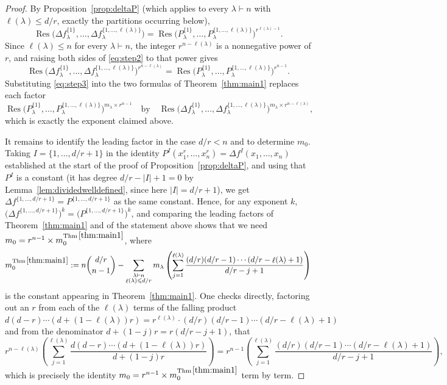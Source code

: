\documentclass[12pt]{amsart}
\theoremstyle{definition}
\newcommand{\Res}{\operatorname{Res}}
\DeclareMathOperator{\len}{\ell}
\begin{document}
\begin{proof}
By Proposition~\ref{prop:deltaP} (which applies to every $\lambda \vdash n$ with $\len(\lambda) \leqslant d/r$, exactly the partitions occurring below),
\begin{equation}
\label{eq:step2}
\Res\Big(\Delta f^{\{1\}}_\lambda,\dots,\Delta f^{\{1,\dots,\len(\lambda)\}}_\lambda\Big) = \Res\Big(P^{\{1\}}_\lambda,\dots,P^{\{1,\dots,\len(\lambda)\}}_\lambda\Big)^{r^{\len(\lambda)-1}}.
\end{equation}
Since $\len(\lambda) \leqslant n$ for every $\lambda \vdash n$, the integer $r^{n-\len(\lambda)}$ is a nonnegative power of $r$, and raising both sides of \eqref{eq:step2} to that power gives
\begin{equation}
\label{eq:step3}
\Res\Big(\Delta f^{\{1\}}_\lambda,\dots,\Delta f^{\{1,\dots,\len(\lambda)\}}_\lambda\Big)^{r^{n-\len(\lambda)}} = \Res\Big(P^{\{1\}}_\lambda,\dots,P^{\{1,\dots,\len(\lambda)\}}_\lambda\Big)^{r^{n-1}}.
\end{equation}
Substituting \eqref{eq:step3} into the two formulas of Theorem~\ref{thm:main1} replaces each factor
\[
\Res\big(P^{\{1\}}_\lambda,\dots,P^{\{1,\dots,\len(\lambda)\}}_\lambda\big)^{m_\lambda \times r^{n-1}} \quad\text{by}\quad \Res\big(\Delta f^{\{1\}}_\lambda,\dots,\Delta f^{\{1,\dots,\len(\lambda)\}}_\lambda\big)^{m_\lambda\times r^{n-\len(\lambda)}},
\]
which is exactly the exponent claimed above.

It remains to identify the leading factor in the case $d/r < n$ and to determine $m_0$. Taking $I = \{1,\dots,d/r+1\}$ in the identity $P^I(x_1^r,\dots,x_n^r) = \Delta f^I(x_1,\dots,x_n)$ established at the start of the proof of Proposition~\ref{prop:deltaP}, and using that $P^I$ is a constant (it has degree $d/r-|I|+1 = 0$ by Lemma~\ref{lem:dividedwelldefined}, since here $|I|=d/r+1$), we get $\Delta f^{\{1,\dots,d/r+1\}} = P^{\{1,\dots,d/r+1\}}$ as the same constant. Hence, for any exponent $k$, $\big(\Delta f^{\{1,\dots,d/r+1\}}\big)^k = \big(P^{\{1,\dots,d/r+1\}}\big)^k$, and comparing the leading factors of Theorem~\ref{thm:main1} and of the statement above shows that we need $m_0 = r^{n-1}\times m_0^{\mathrm{Thm}\,\ref{thm:main1}}$, where
\[
m_0^{\mathrm{Thm}\,\ref{thm:main1}} := n\binom{d/r}{n-1} - \sum_{\substack{\lambda\vdash n\\ \len(\lambda)\leqslant d/r}} m_\lambda\left(\sum_{j=1}^{\len(\lambda)}\frac{(d/r)(d/r-1)\cdots(d/r-\len(\lambda)+1)}{d/r-j+1}\right)
\]
is the constant appearing in Theorem~\ref{thm:main1}. One checks directly, factoring out an $r$ from each of the $\len(\lambda)$ terms of the falling product $d(d-r)\cdots(d+(1-\len(\lambda))r) = r^{\len(\lambda)}\cdot (d/r)(d/r-1)\cdots(d/r-\len(\lambda)+1)$ and from the denominator $d+(1-j)r = r(d/r-j+1)$, that
\[
r^{n-\len(\lambda)}\left(\sum_{j=1}^{\len(\lambda)}\frac{d(d-r)\cdots(d+(1-\len(\lambda))r)}{d+(1-j)r}\right) = r^{n-1}\left(\sum_{j=1}^{\len(\lambda)}\frac{(d/r)(d/r-1)\cdots(d/r-\len(\lambda)+1)}{d/r-j+1}\right),
\]
which is precisely the identity $m_0 = r^{n-1}\times m_0^{\mathrm{Thm}\,\ref{thm:main1}}$ term by term.


\end{proof}
\end{document}
